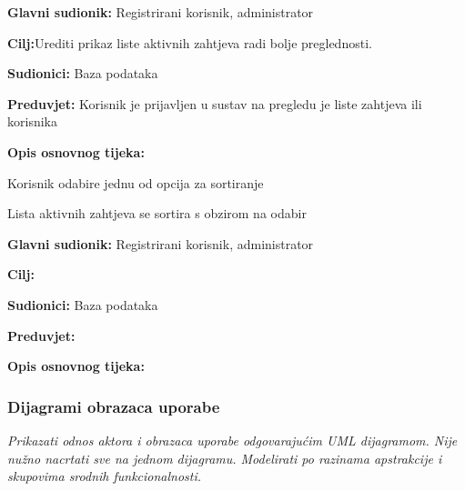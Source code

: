 \noindent {}
\begin{packed_item}
	\item \textbf{Glavni sudionik: }Registrirani korisnik, administrator
	\item  \textbf{Cilj:}Urediti prikaz liste aktivnih zahtjeva radi bolje preglednosti.
	\item  \textbf{Sudionici:} Baza podataka
	\item  \textbf{Preduvjet:} Korisnik je prijavljen u sustav na pregledu je liste zahtjeva ili korisnika
	\item  \textbf{Opis osnovnog tijeka:}
	
	\item[] \begin{packed_enum}
		
		\item 	Korisnik odabire jednu od opcija za sortiranje
		\item 	Lista aktivnih zahtjeva se sortira s obzirom na odabir
	\end{packed_enum}
	
\end{packed_item}

\noindent {}
\begin{packed_item}
	\item \textbf{Glavni sudionik: }Registrirani korisnik, administrator
	\item  \textbf{Cilj:}
	\item  \textbf{Sudionici:} Baza podataka
	\item  \textbf{Preduvjet:} 
	\item  \textbf{Opis osnovnog tijeka:}
	
	\item[] \begin{packed_enum}
		
		\item 	
		\item 	
	\end{packed_enum}
	
\end{packed_item}

\subsubsection{Dijagrami obrazaca uporabe}

\textit{Prikazati odnos aktora i obrazaca uporabe odgovarajućim UML dijagramom. Nije nužno nacrtati sve na jednom dijagramu. Modelirati po razinama apstrakcije i skupovima srodnih funkcionalnosti.}
\eject		

